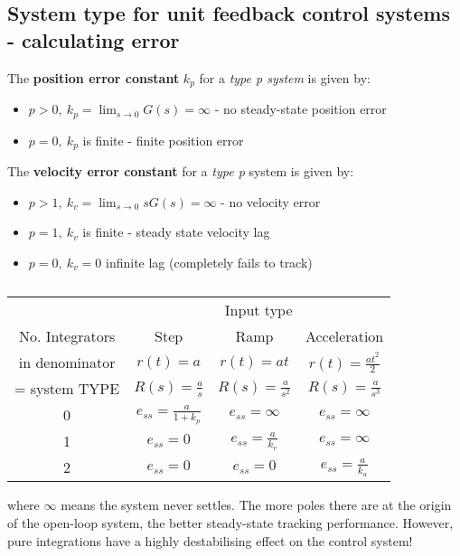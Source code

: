 \subsection{System type for unit feedback control systems - calculating error}
The \textbf{position error constant} $k_p$ for a \textit{type p system} is given by:
\begin{itemize}
  \item $p > 0, \ k_p = \lim_{s\rightarrow 0} G(s) = \infty$ - no steady-state position error
  \item $p=0, \ k_p$ is finite - finite position error
\end{itemize}
The \textbf{velocity error constant} for a \textit{type p} system is given by:
\begin{itemize}
  \item $p> 1, \ k_v = \lim_{s\rightarrow 0} sG(s) = \infty$ - no velocity error
  \item $p = 1, \ k_v$ is finite - steady state velocity lag
  \item $p = 0, \ k_v = 0$ infinite lag (completely fails to track)
\end{itemize}
\begin{table}[H]
  \begin{center}
    \begin{tabular}{|c|c|c|c|}
      \hline
                      & \multicolumn{3}{c|}{Input type}                                                       \\
      \cline{2-4}
      No. Integrators & Step                            & Ramp                     & Acceleration             \\
      in denominator  & $r(t) = a$                      & $r(t) = at$              & $r(t) = \frac{at^2}{2}$  \\
      = system TYPE   & $R(s) = \frac{a}{s}$            & $R(s) = \frac{a}{s^2}$   & $R(s) = \frac{a}{s^3}$   \\
      \hline
      \hline
      0               & $e_{ss} = \frac{a}{1+k_p}$      & $e_{ss} = \infty$        & $e_{ss} = \infty$        \\
      \hline
      1               & $e_{ss} = 0$                    & $e_{ss} = \frac{a}{k_v}$ & $e_{ss} = \infty$        \\
      \hline
      2               & $e_{ss} = 0$                    & $e_{ss} = 0$             & $e_{ss} = \frac{a}{k_a}$ \\
      \hline
    \end{tabular}
  \end{center}
  \caption{}
\end{table}
where $\infty$ means the system never settles. The more poles there are at the origin of the open-loop system, the better steady-state tracking performance. However, pure integrations have a highly destabilising effect on the control system!
